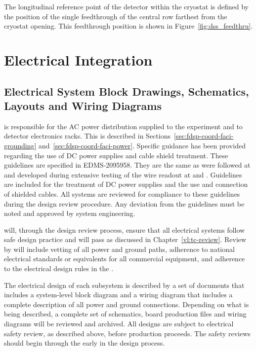 The longitudinal reference point of the detector within the cryostat
is defined by the position of the single feedthrough of the central row
farthest from the cryostat opening. This feedthrough position
is shown in Figure~\ref{fig:dss_feedthru}.






\section{Electrical Integration}
\label{sec:fdsp-Integ-electrical}



\subsection{Electrical System Block Drawings, Schematics, Layouts and Wiring Diagrams}
\label{sec:fdsp-coord-electrical}


 is responsible for the AC power distribution supplied to
the experiment and to detector electronics racks.  This is described
in Sections~\ref{sec:fdsp-coord-faci-grounding}
and~\ref{sec:fdsp-coord-faci-power}.  Specific guidance has been
provided regarding the use of DC power supplies and cable shield
treatment.  These guidelines are specified in
EDMS-2095958\cite{bib:cernedms2095958}. They are the same as were
followed at  and developed during extensive testing
of the  wire readout at  and .
Guidelines are included for the treatment of DC power supplies and the
use and connection of shielded cables.  All systems are reviewed for
compliance to these guidelines during the design review procedure.
Any deviation from the guidelines must be noted and approved by system
engineering.

 will, through the design review process, ensure
that all electrical systems  follow safe design practice and
will pass  as discussed in Chapter~\ref{vl:tc-review}.  
Review by  will include
vetting of all power and ground paths, adherence to national
electrical standards or equivalents for all commercial equipment, and
adherence to the electrical design rules in the .

The electrical design of each subsystem is described by a set of
documents that includes a system-level block diagram and a wiring
diagram that includes a complete description of all power and ground
connections.  Depending on what is being described, a complete set of
schematics, board production files and wiring diagrams will be
reviewed and archived.  All designs are subject to electrical safety
review, as described above, before production proceeds. The safety
reviews should begin through the  early in the design
process.



